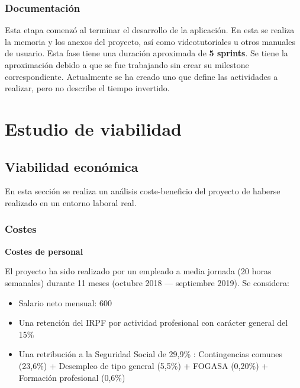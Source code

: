 \subsubsection{Documentación}
Esta etapa comenzó al terminar el desarrollo de la aplicación. En esta se realiza la memoria y los anexos del proyecto, así como videotutoriales u otros manuales de usuario. Esta fase tiene una duración aproximada de \textbf{5 sprints}. Se tiene la aproximación debido a que se fue trabajando sin crear su milestone correspondiente. Actualmente se ha creado uno que define las actividades a realizar, pero no describe el tiempo invertido.

\section{Estudio de viabilidad}
\subsection{Viabilidad económica}
En esta sección se realiza un análisis coste-beneficio del proyecto de haberse realizado en un entorno laboral real.

\subsubsection{Costes}
\textbf{Costes de personal}

El proyecto ha sido realizado por un empleado a media jornada (20 horas semanales) durante 11 meses (octubre 2018 --- septiembre 2019). Se considera:
\begin{itemize}
	\tightlist
	\item Salario neto mensual: 600 \officialeuro
	\item Una retención del IRPF por actividad profesional con carácter general del 15\% \cite{agencia_tributaria_cuadro_2019}
	\item Una retribución a la Seguridad Social de 29,9\% \cite{ministerio_de_empleo_y_seguridad_social_bases_2019}: Contingencias comunes (23,6\%) +  Desempleo de tipo general (5,5\%) +  FOGASA (0,20\%) + Formación profesional (0,6\%)
\end{itemize}


